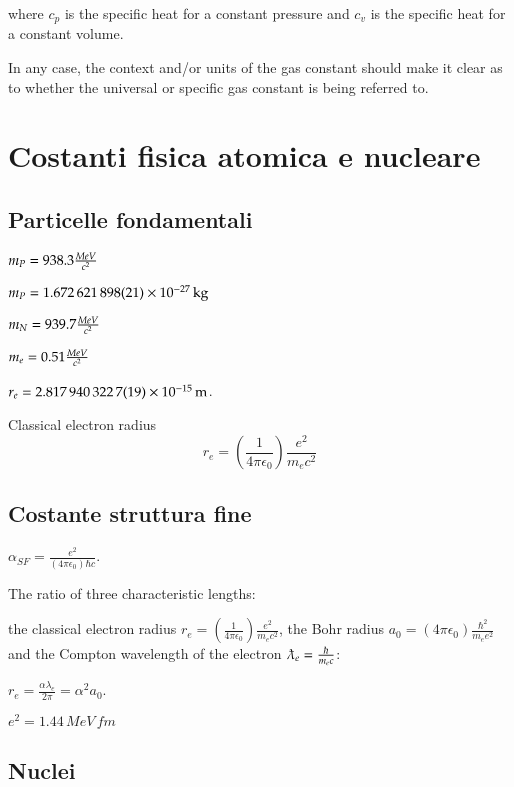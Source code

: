 \documentclass[main.tex]{subfiles}
\begin{document}
where $c_p$ is the specific heat for a constant pressure and $c_v$ is the specific heat for a constant volume.

In any case, the context and/or units of the gas constant should make it clear as to whether the universal or specific gas constant is being referred to.
 
\chapter{Costanti fisica atomica e nucleare}
\PartialToc

\section{Particelle fondamentali}

\begin{itemize*}
\item $m_P=938.3\frac{MeV}{c^2}$
\item $m_P=\SI{1.672 621 898+-0.000 000 021e-27}{\kilo\gram}$
\item $m_N=939.7\frac{MeV}{c^2}$
\item $m_e=0.51\frac{MeV}{c^2}$
\item $r_e=\SI{2.817 940 3227+-0.000 000 0019e-15}{\meter}$.

\begin{definition}{Classical electron radius}
\begin{equation*}
r_e=(\frac{1}{4\pi\epsilon_0})\frac{e^2}{m_ec^2}
\end{equation*}
\end{definition}
\end{itemize*}



\section{Costante struttura fine}
 
 $\alpha_{SF}=\frac{e^2}{(4\pi\epsilon_0)\hbar c}$.

The ratio of three characteristic lengths:

the classical electron radius $r_e=(\frac{1}{4\pi\epsilon_0})\frac{e^2}{m_ec^2}$, the Bohr radius $a_0=(4\pi\epsilon_0)\frac{\hbar^2}{m_ee^2}$  and the Compton wavelength of the electron $\lambdabar_e=\frac{\hbar}{m_ec}$:

$r_e=\frac{\alpha\lambda_e}{2\pi}=\alpha^2a_0$.

$e^2=1.44\,MeV\,fm$


\section{Nuclei}
\end{document}
